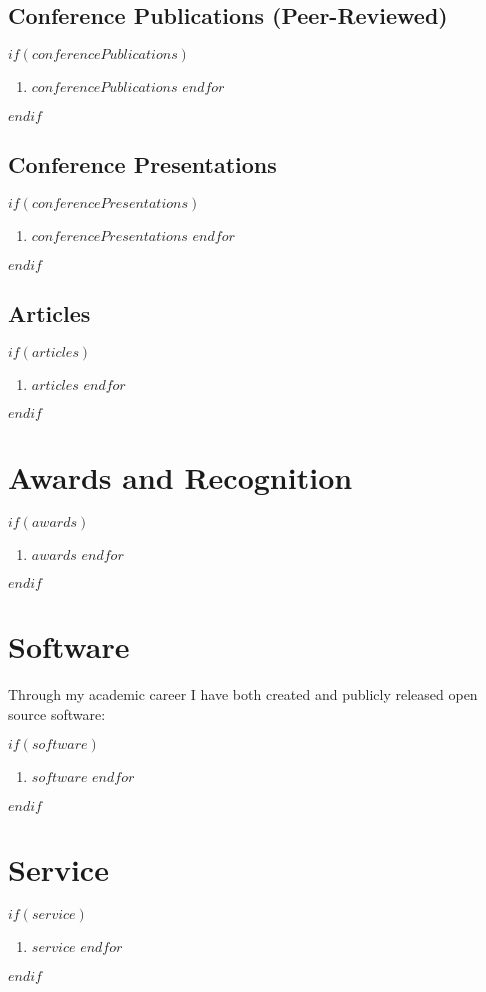 \documentclass[$fontsize$, a4paper]{article}
\begin{document}
\subsection*{Conference Publications (Peer-Reviewed)}
$if(conferencePublications)$
\begin{enumerate}
$for(conferencePublications)$
\item $conferencePublications$
$endfor$
\end{enumerate}
$endif$

\subsection*{Conference Presentations}
$if(conferencePresentations)$
\begin{enumerate}
$for(conferencePresentations)$
\item $conferencePresentations$
$endfor$
\end{enumerate}
$endif$

\subsection*{Articles}
$if(articles)$
\begin{enumerate}
$for(articles)$
\item $articles$
$endfor$
\end{enumerate}
$endif$

\section*{Awards and Recognition}
$if(awards)$
\begin{enumerate}
$for(awards)$
\item $awards$
$endfor$
\end{enumerate}
$endif$

\section*{Software}
Through my academic career I have both created and publicly released open source software:

$if(software)$
\begin{enumerate}
$for(software)$
\item $software$
$endfor$
\end{enumerate}
$endif$

\section*{Service}
$if(service)$
\begin{enumerate}
$for(service)$
\item $service$
$endfor$
\end{enumerate}
$endif$
\end{document}
